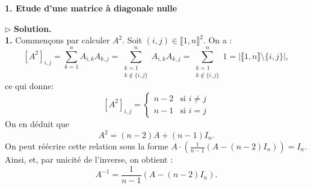 \documentclass[11pt,a4paper]{article}
\begin{document}
\begin{center}
    \large \textbf{1. Etude d'une matrice à diagonale nulle}
\end{center}
\vspace{0.2cm}

\noindent{}
\vspace{0.4cm}

\noindent $\triangleright$ \textbf{Solution.} \\
\textbf{1.} Commençons par calculer $A^2$. Soit $(i,j) \in \llbracket 1,n \rrbracket^2$. On a :
\[
[A^2]_{i,j} = \sum_{k=1}^n A_{i,k} A_{k,j} = \sum_{\substack{k=1 \\ k \notin \{i,j\}}}^n A_{i,k} A_{k,j} = \sum_{\substack{k=1 \\ k \notin \{i,j\}}}^n 1 = \left| \llbracket 1,n \rrbracket \setminus \{i,j\} \right|,
\]
ce qui donne:
\[
[A^2]_{i,j} = \begin{cases} n-2 & \text{si } i \neq j \\ n-1 & \text{si } i = j \end{cases}
\]
On en déduit que 
\[
A^2 = (n-2)A + (n-1)I_n.
\]
On peut réécrire cette relation sous la forme $A \cdot \left( \frac{1}{n-1}(A - (n-2)I_n) \right) = I_n$. Ainsi,  et, par unicité de l'inverse, on obtient :
\[
\boxed{A^{-1} = \frac{1}{n-1}(A - (n-2)I_n).}
\]
\end{document}
